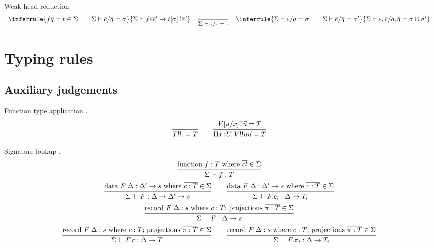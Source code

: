 \documentclass[acmlarge,fleqn]{acmart}\settopmatter{}
\renewcommand{\|}{\mid}
\begin{document}

Weak head reduction 
\[
\begin{array}{lll}
\inferrule{f \overline q = t \in \Sigma \qquad \Sigma \vdash \overline{e}/\overline{q} = \sigma}
{\Sigma \vdash f \overline{e} \overline{e}' \to t[\sigma] \bang \overline{e}'}
&
\ru{}
{\Sigma \vdash \cdot/\cdot = \cdot} %
&
\inferrule{\Sigma \vdash e/q = \sigma \qquad \Sigma \vdash \overline{e}/\overline{q} = \sigma'}
{\Sigma \vdash e, \overline{e}/q, \overline{q} = \sigma \uplus \sigma'}%
\end{array}
\]


\section{Typing rules}
\label{sec:typing}


\subsection{Auxiliary judgements}

Function type application .
\[
  \ru{}{T !! . = T}
\qquad
  \ru{\subst u x V !! \vec u = T
    }{\funT x U V !! u \vec u = T}
\]


Signature lookup .
\begin{gather*}
  \ru{\funsig \in \Sigma
    }{\Sigma \der f : T}
\\
  \ru{\datasig \in \Sigma
    }{\Sigma \der F : \Delta \to \Delta' \to s}
\qquad
  \ru{\datasig \in \Sigma
    }{\Sigma \der F.c_i : \Delta \to T_i}
\\
  \ru{\recsig \in \Sigma
    }{\Sigma \der F : \Delta \to s}
\\
  \ru{\recsig \in \Sigma
    }{\Sigma \der F.c : \Delta \to T}
\qquad
  \ru{\recsig \in \Sigma
    }{\Sigma \der F.\pi_i : \Delta \to T_i}
\end{gather*}
\end{document}
